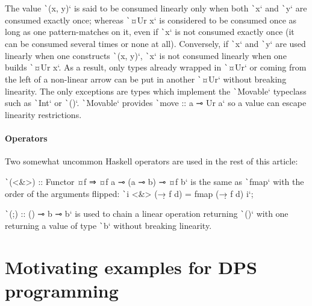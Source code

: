 \documentclass[english]{jflart}
\begin{document}
The value \texttt`(x, y)` is said to be consumed linearly only when both \texttt`x` and \texttt`y` are consumed exactly once; whereas \texttt`¤Ur x` is considered to be consumed once as long as one pattern-matches on it, even if \texttt`x` is not consumed exactly once (it can be consumed several times or none at all). Conversely, if \texttt`x` and \texttt`y` are used linearly when one constructs \texttt`(x, y)`, \texttt`x` is not consumed linearly when one builds \texttt`¤Ur x`. As a result, only types already wrapped in \texttt`¤Ur` or coming from the left of a non-linear arrow can be put in another \texttt`¤Ur` without breaking linearity. The only exceptions are types which implement the \texttt`Movable` typeclass such as \texttt`Int` or \texttt`()`. \texttt`Movable` provides \texttt`move :: a ⊸ Ur a` so a value can escape linearity restrictions.


\paragraph{Operators}

Two somewhat uncommon Haskell operators are used in the rest of this article:

\texttt`(<&>) :: Functor ¤f ⇒ ¤f a ⊸ (a ⊸ b) ⊸ ¤f b` is the same as \texttt`fmap` with the order of the arguments flipped: \texttt`i <&> (\d → f d) = fmap (\d → f d) i`;%

\texttt`(;) :: () ⊸ b ⊸ b` is used to chain a linear operation returning \texttt`()` with one returning a value of type \texttt`b` without breaking linearity.

\section{Motivating examples for DPS programming}\label{sec:motivating-examples}
\end{document}

